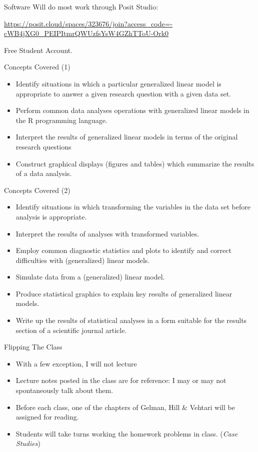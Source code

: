 \documentclass[
  ignorenonframetext,
]{beamer}
\begin{document}
\begin{frame}{Software}
\protect\hypertarget{software}{}
Will do most work through Posit Studio:

\url{https://posit.cloud/spaces/323676/join?access_code=-cWB4jXG0_PEIPItmrQWUzfsYsW4GZhTToU-Ork0}

Free Student Account.
\end{frame}

\begin{frame}{Concepts Covered (1)}
\protect\hypertarget{concepts-covered-1}{}
\begin{itemize}
\item
  Identify situations in which a particular generalized linear model is
  appropriate to answer a given research question with a given data set.
\item
  Perform common data analyses operations with generalized linear models
  in the R programming language.
\item
  Interpret the results of generalized linear models in terms of the
  original research questions
\item
  Construct graphical displays (figures and tables) which summarize the
  results of a data analysis.
\end{itemize}
\end{frame}

\begin{frame}{Concepts Covered (2)}
\protect\hypertarget{concepts-covered-2}{}
\begin{itemize}
\item
  Identify situations in which transforming the variables in the data
  set before analysis is appropriate.
\item
  Interpret the results of analyses with transformed variables.
\item
  Employ common diagnostic statistics and plots to identify and correct
  difficulties with (generalized) linear models.
\item
  Simulate data from a (generalized) linear model.
\item
  Produce statistical graphics to explain key results of generalized
  linear models.
\item
  Write up the results of statistical analyses in a form suitable for
  the results section of a scientific journal article.
\end{itemize}
\end{frame}

\begin{frame}{Flipping The Class}
\protect\hypertarget{flipping-the-class}{}
\begin{itemize}
\item
  With a few exception, I will not lecture
\item
  Lecture notes posted in the class are for reference: I may or may not
  spontaneously talk about them.
\item
  Before each class, one of the chapters of Gelman, Hill \& Vehtari will
  be assigned for reading.
\item
  Students will take turns working the homework problems in class.
  (\emph{Case Studies})
\end{itemize}
\end{frame}
\end{document}
